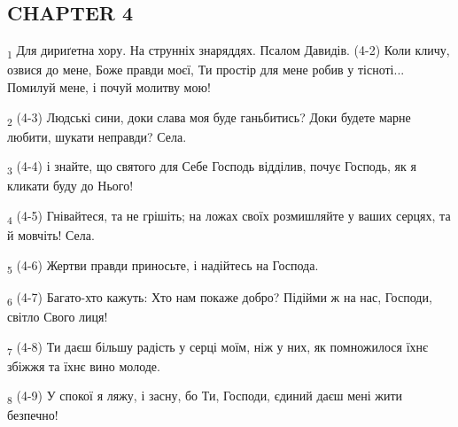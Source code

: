 \subsection{CHAPTER 4}
\begin{tcolorbox}
\textsubscript{1} Для дириґетна хору. На струнніх знаряддях. Псалом Давидів. (4-2) Коли кличу, озвися до мене, Боже правди моєї, Ти простір для мене робив у тісноті... Помилуй мене, і почуй молитву мою!
\end{tcolorbox}
\begin{tcolorbox}
\textsubscript{2} (4-3) Людські сини, доки слава моя буде ганьбитись? Доки будете марне любити, шукати неправди? Села.
\end{tcolorbox}
\begin{tcolorbox}
\textsubscript{3} (4-4) і знайте, що святого для Себе Господь відділив, почує Господь, як я кликати буду до Нього!
\end{tcolorbox}
\begin{tcolorbox}
\textsubscript{4} (4-5) Гнівайтеся, та не грішіть; на ложах своїх розмишляйте у ваших серцях, та й мовчіть! Села.
\end{tcolorbox}
\begin{tcolorbox}
\textsubscript{5} (4-6) Жертви правди приносьте, і надійтесь на Господа.
\end{tcolorbox}
\begin{tcolorbox}
\textsubscript{6} (4-7) Багато-хто кажуть: Хто нам покаже добро? Підійми ж на нас, Господи, світло Свого лиця!
\end{tcolorbox}
\begin{tcolorbox}
\textsubscript{7} (4-8) Ти даєш більшу радість у серці моїм, ніж у них, як помножилося їхнє збіжжя та їхнє вино молоде.
\end{tcolorbox}
\begin{tcolorbox}
\textsubscript{8} (4-9) У спокої я ляжу, і засну, бо Ти, Господи, єдиний даєш мені жити безпечно!
\end{tcolorbox}
